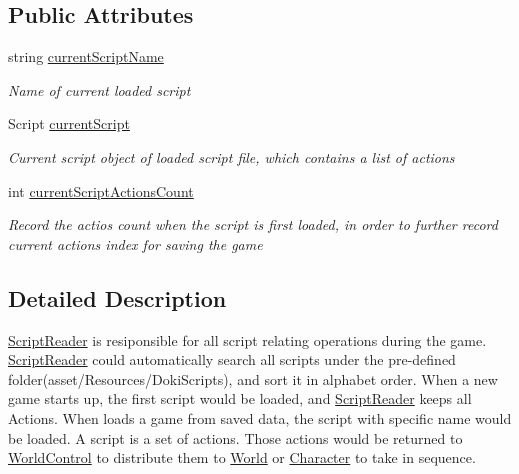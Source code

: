 \subsection*{Public Attributes}
\begin{DoxyCompactItemize}
\item 
string \hyperlink{class_script_reader_a3283923dbeb9c29dedec2f76fee03709}{current\+Script\+Name}
\begin{DoxyCompactList}\small\item\em Name of current loaded script \end{DoxyCompactList}\item 
Script \hyperlink{class_script_reader_a91937ac5ebccf66a8de49c27cde37b4a}{current\+Script}
\begin{DoxyCompactList}\small\item\em Current script object of loaded script file, which contains a list of actions \end{DoxyCompactList}\item 
int \hyperlink{class_script_reader_a48c647f1adf56637f27727921e9aef6f}{current\+Script\+Actions\+Count}
\begin{DoxyCompactList}\small\item\em Record the actios count when the script is first loaded, in order to further record current action\textquotesingle{}s index for saving the game \end{DoxyCompactList}\end{DoxyCompactItemize}


\subsection{Detailed Description}
\hyperlink{class_script_reader}{Script\+Reader} is resiponsible for all script relating operations during the game. \hyperlink{class_script_reader}{Script\+Reader} could automatically search all scripts under the pre-\/defined folder(asset/\+Resources/\+Doki\+Scripts), and sort it in alphabet order. When a new game starts up, the first script would be loaded, and \hyperlink{class_script_reader}{Script\+Reader} keeps all Actions. When loads a game from saved data, the script with specific name would be loaded. A script is a set of actions. Those actions would be returned to \hyperlink{class_world_control}{World\+Control} to distribute them to \hyperlink{class_world}{World} or \hyperlink{class_character}{Character} to take in sequence. 



